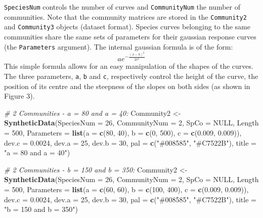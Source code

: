 \documentclass[
]{article}
\newenvironment{Shaded}{\begin{snugshade}}{\end{snugshade}}
\newcommand{\CommentTok}[1]{\textcolor[rgb]{0.56,0.35,0.01}{\textit{#1}}}
\newcommand{\DataTypeTok}[1]{\textcolor[rgb]{0.13,0.29,0.53}{#1}}
\newcommand{\DecValTok}[1]{\textcolor[rgb]{0.00,0.00,0.81}{#1}}
\newcommand{\FloatTok}[1]{\textcolor[rgb]{0.00,0.00,0.81}{#1}}
\newcommand{\KeywordTok}[1]{\textcolor[rgb]{0.13,0.29,0.53}{\textbf{#1}}}
\newcommand{\NormalTok}[1]{#1}
\newcommand{\OtherTok}[1]{\textcolor[rgb]{0.56,0.35,0.01}{#1}}
\newcommand{\StringTok}[1]{\textcolor[rgb]{0.31,0.60,0.02}{#1}}
\begin{document}
\texttt{SpeciesNum} controls the number of curves and
\texttt{CommunityNum} the number of communities. Note that the community
matrices are stored in the \texttt{Community2} and \texttt{Community3}
objects (dataset format). Species curves belonging to the same
communities share the same sets of parameters for their gaussian
response curves (the \texttt{Parameters} argument). The internal
gaussian formula is of the form: \[ae^{-\frac{(x-b)^2}{2c^2}}\] This
simple formula allows for an easy manipulation of the shapes of the
curves. The three parameters, \texttt{a}, \texttt{b} and \texttt{c},
respectively control the height of the curve, the position of its centre
and the steepness of the slopes on both sides (as shown in Figure 3).

\begin{Shaded}
\begin{Highlighting}[]
\CommentTok{\# 2 Communities {-} a = 80 and a = 40:}
\NormalTok{Community2 \textless{}{-}}\StringTok{ }\KeywordTok{SyntheticData}\NormalTok{(}\DataTypeTok{SpeciesNum =} \DecValTok{26}\NormalTok{, }\DataTypeTok{CommunityNum =} \DecValTok{2}\NormalTok{, }\DataTypeTok{SpCo =} \OtherTok{NULL}\NormalTok{, }
    \DataTypeTok{Length =} \DecValTok{500}\NormalTok{, }\DataTypeTok{Parameters =} \KeywordTok{list}\NormalTok{(}\DataTypeTok{a =} \KeywordTok{c}\NormalTok{(}\DecValTok{80}\NormalTok{, }\DecValTok{40}\NormalTok{), }\DataTypeTok{b =} \KeywordTok{c}\NormalTok{(}\DecValTok{0}\NormalTok{, }\DecValTok{500}\NormalTok{), }\DataTypeTok{c =} \KeywordTok{c}\NormalTok{(}\FloatTok{0.009}\NormalTok{, }
        \FloatTok{0.009}\NormalTok{)), }\DataTypeTok{dev.c =} \FloatTok{0.0024}\NormalTok{, }\DataTypeTok{dev.a =} \DecValTok{25}\NormalTok{, }\DataTypeTok{dev.b =} \DecValTok{30}\NormalTok{, }\DataTypeTok{pal =} \KeywordTok{c}\NormalTok{(}\StringTok{"\#008585"}\NormalTok{, }
        \StringTok{"\#C7522B"}\NormalTok{), }\DataTypeTok{title =} \StringTok{"a = 80 and a = 40"}\NormalTok{)}

\CommentTok{\# 2 Communities {-} b = 150 and b = 350:}
\NormalTok{Community2 \textless{}{-}}\StringTok{ }\KeywordTok{SyntheticData}\NormalTok{(}\DataTypeTok{SpeciesNum =} \DecValTok{26}\NormalTok{, }\DataTypeTok{CommunityNum =} \DecValTok{2}\NormalTok{, }\DataTypeTok{SpCo =} \OtherTok{NULL}\NormalTok{, }
    \DataTypeTok{Length =} \DecValTok{500}\NormalTok{, }\DataTypeTok{Parameters =} \KeywordTok{list}\NormalTok{(}\DataTypeTok{a =} \KeywordTok{c}\NormalTok{(}\DecValTok{60}\NormalTok{, }\DecValTok{60}\NormalTok{), }\DataTypeTok{b =} \KeywordTok{c}\NormalTok{(}\DecValTok{100}\NormalTok{, }\DecValTok{400}\NormalTok{), }\DataTypeTok{c =} \KeywordTok{c}\NormalTok{(}\FloatTok{0.009}\NormalTok{, }
        \FloatTok{0.009}\NormalTok{)), }\DataTypeTok{dev.c =} \FloatTok{0.0024}\NormalTok{, }\DataTypeTok{dev.a =} \DecValTok{25}\NormalTok{, }\DataTypeTok{dev.b =} \DecValTok{30}\NormalTok{, }\DataTypeTok{pal =} \KeywordTok{c}\NormalTok{(}\StringTok{"\#008585"}\NormalTok{, }
        \StringTok{"\#C7522B"}\NormalTok{), }\DataTypeTok{title =} \StringTok{"b = 150 and b = 350"}\NormalTok{)}


\end{Highlighting}
\end{Shaded}
\end{document}
